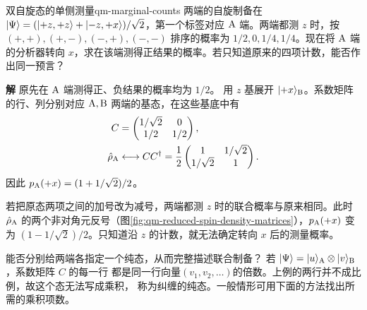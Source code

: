 \begin{example}{双自旋态的单侧测量}{qm-marginal-counts}
    两端的自旋制备在 $\lvert\Psi\rangle = (\lvert+z,+z\rangle + \lvert-z,+x\rangle)/\sqrt2$，第一个标签对应 $\mathrm{A}$ 端。两端都测 $z$ 时，按 $(+,+),(+,-),(-,+),(-,-)$ 排序的概率为 $1/2,0,1/4,1/4$。现在将 $\mathrm{A}$ 端的分析器转向 $x$，求在该端测得正结果的概率。若只知道原来的四项计数，能否作出同一预言？
    \par\smallskip\textbf{解}\quad
    原先在 $\mathrm{A}$ 端测得正、负结果的概率均为 $1/2$。
    用 $z$ 基展开 $\lvert+x\rangle_{\mathrm{B}}$。系数矩阵的行、列分别对应 $\mathrm{A},\mathrm{B}$ 两端的基态，在这些基底中有
    \begin{subequations}
        \begin{align}
            C &= \begin{pmatrix}1/\sqrt2&0\\1/2&1/2\end{pmatrix},\\
            \hat{\rho}_{\mathrm{A}} &\longleftrightarrow CC^\dagger
            = \frac12\begin{pmatrix}1&1/\sqrt2\\1/\sqrt2&1\end{pmatrix}.
        \end{align}
    \end{subequations}
    因此 $p_{\mathrm{A}}(+x) = (1 + 1/\sqrt2)/2$。
    \begin{notecaptionblock}
        \label{fig:qm-reduced-spin-density-matrices}
    \end{notecaptionblock}
    若把原态两项之间的加号改为减号，两端都测 $z$ 时的联合概率与原来相同。此时 $\hat{\rho}_{\mathrm{A}}$ 的两个非对角元反号（图\ref{fig:qm-reduced-spin-density-matrices}），$p_{\mathrm{A}}(+x)$ 变为 $(1 - 1/\sqrt2)/2$。只知道沿 $z$ 的计数，就无法确定转向 $x$ 后的测量概率。
\end{example}

能否分别给两端各指定一个纯态，从而完整描述联合制备？
若 $\lvert\Psi\rangle = \lvert u\rangle_{\mathrm{A}} \otimes \lvert v\rangle_{\mathrm{B}}$，系数矩阵 $C$ 的每一行
都是同一行向量$(v_1,v_2,\ldots)$的倍数。上例的两行并不成比例，故这个态无法写成乘积，
称为纠缠的纯态。一般情形可用下面的方法找出所需的乘积项数。

